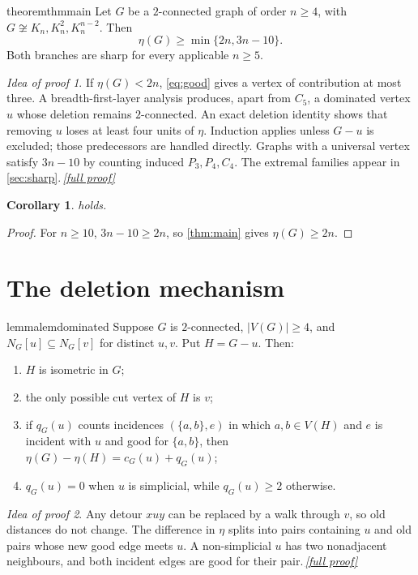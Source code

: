\documentclass[11pt,a4paper]{article}
\theoremstyle{plain}
\newtheorem{corollary}[theorem]{Corollary}
\theoremstyle{definition}
\theoremstyle{remark}
\newtheorem*{proofidea}{Idea of proof}
\newcommand{\fullproofref}[1]{\,\hyperref[#1]{\textit{[full proof]}}}
\begin{document}
\begin{restatable}{theorem}{thmmain}\label{thm:main}
Let $G$ be a $2$-connected graph of order $n\ge4$, with
$G\not\cong K_n,K_n^2,K_n^{n-2}$. Then
\[
 \eta(G)\ge \min\{2n,3n-10\}.
\]
Both branches are sharp for every applicable $n\ge5$.
\end{restatable}
\begin{proofidea}
If $\eta(G)<2n$, \eqref{eq:good} gives a vertex of contribution at most
three. A breadth-first-layer analysis produces, apart from $C_5$, a
dominated vertex $u$ whose deletion remains $2$-connected. An exact
deletion identity shows that removing $u$ loses at least four units of
$\eta$. Induction applies unless $G-u$ is excluded; those predecessors
are handled directly. Graphs with a universal vertex satisfy $3n-10$ by
counting induced $P_3,P_4,C_4$. The extremal families appear in
\cref{sec:sharp}.\fullproofref{pf:main}
\end{proofidea}
\begin{corollary}\label{cor:conjecture}
 holds.
\end{corollary}
\begin{proof}
For $n\ge10$, $3n-10\ge2n$, so \cref{thm:main} gives $\eta(G)\ge2n$.
\end{proof}

\section{The deletion mechanism}
\begin{restatable}{lemma}{lemdominated}\label{lem:dominated}
Suppose $G$ is $2$-connected, $|V(G)|\ge4$, and
$N_G[u]\subseteq N_G[v]$ for distinct $u,v$. Put $H=G-u$. Then:
\begin{enumerate}[label=\textup{(\roman*)}]
\item $H$ is isometric in $G$;
\item the only possible cut vertex of $H$ is $v$;
\item if $q_G(u)$ counts incidences $(\{a,b\},e)$ in which
      $a,b\in V(H)$ and $e$ is incident with $u$ and good for $\{a,b\}$,
      then $\eta(G)-\eta(H)=c_G(u)+q_G(u)$;
\item $q_G(u)=0$ when $u$ is simplicial, while $q_G(u)\ge2$ otherwise.
\end{enumerate}
\end{restatable}
\begin{proofidea}
Any detour $xuy$ can be replaced by a walk through $v$, so old distances
do not change. The difference in $\eta$ splits into pairs containing $u$
and old pairs whose new good edge meets $u$. A non-simplicial $u$ has
two nonadjacent neighbours, and both incident edges are good for their
pair.\fullproofref{pf:dominated}
\end{proofidea}
\end{document}
